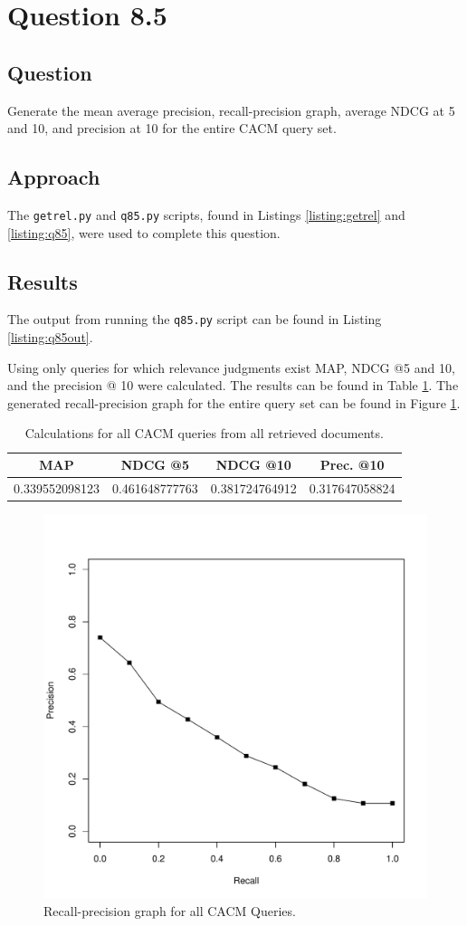 \section{Question 8.5}

\subsection{Question}
Generate the mean average precision, recall-precision graph, average NDCG at 5 and 10, and precision at 10 for the entire CACM query set.

\subsection{Approach}
The \texttt{getrel.py} and \texttt{q85.py} scripts, found in Listings \ref{listing:getrel} and \ref{listing:q85}, were used to complete this question.

\subsection{Results}
The output from running the \texttt{q85.py} script can be found in Listing \ref{listing:q85out}.

Using only queries for which relevance judgments exist MAP, NDCG @5 and 10, and the precision @ 10 were calculated.  The results can be found in Table \ref{tab:q85}. The generated recall-precision graph for the entire query set can be found in Figure \ref{fig:overallavg}.

\begin{table}[h!]
\centering
\begin{tabular}{ | c | c | c | c | }
\hline
MAP & NDCG @5 & NDCG @10 & Prec. @10 \\
\hline
0.339552098123 & 0.461648777763 & 0.381724764912 & 0.317647058824 \\
\hline
\end{tabular}
\caption{Calculations for all CACM queries from all retrieved documents.}
\label{tab:q85}
\end{table}

\begin{figure}[H]
\centering
\label{fig:overallavg}
\includegraphics[scale=.6]{code/getrel/avgq85.pdf}
\caption{Recall-precision graph for all CACM Queries.}
\end{figure}
